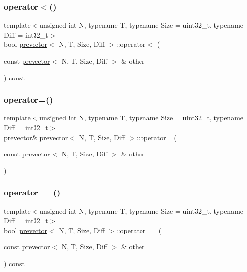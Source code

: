 \subsubsection{\texorpdfstring{operator$<$()}{operator<()}}
{\footnotesize\ttfamily template$<$unsigned int N, typename T, typename Size = uint32\+\_\+t, typename Diff = int32\+\_\+t$>$ \\
bool \mbox{\hyperlink{classprevector}{prevector}}$<$ N, T, Size, Diff $>$\+::operator$<$ (\begin{DoxyParamCaption}\item[{const \mbox{\hyperlink{classprevector}{prevector}}$<$ N, T, Size, Diff $>$ \&}]{other }\end{DoxyParamCaption}) const\hspace{0.3cm}{\ttfamily [inline]}}

\mbox{\label{classprevector_a325af27672f21e7f2a01d8cdae7abba8}} 
\subsubsection{\texorpdfstring{operator=()}{operator=()}}
{\footnotesize\ttfamily template$<$unsigned int N, typename T, typename Size = uint32\+\_\+t, typename Diff = int32\+\_\+t$>$ \\
\mbox{\hyperlink{classprevector}{prevector}}\& \mbox{\hyperlink{classprevector}{prevector}}$<$ N, T, Size, Diff $>$\+::operator= (\begin{DoxyParamCaption}\item[{const \mbox{\hyperlink{classprevector}{prevector}}$<$ N, T, Size, Diff $>$ \&}]{other }\end{DoxyParamCaption})\hspace{0.3cm}{\ttfamily [inline]}}

\mbox{\label{classprevector_a6de6f6aff0a0ca527754020dbb26f7ab}} 
\subsubsection{\texorpdfstring{operator==()}{operator==()}}
{\footnotesize\ttfamily template$<$unsigned int N, typename T, typename Size = uint32\+\_\+t, typename Diff = int32\+\_\+t$>$ \\
bool \mbox{\hyperlink{classprevector}{prevector}}$<$ N, T, Size, Diff $>$\+::operator== (\begin{DoxyParamCaption}\item[{const \mbox{\hyperlink{classprevector}{prevector}}$<$ N, T, Size, Diff $>$ \&}]{other }\end{DoxyParamCaption}) const\hspace{0.3cm}{\ttfamily [inline]}}

